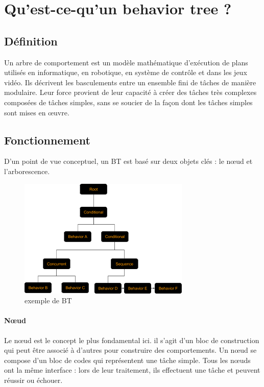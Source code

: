 \documentclass[titlepage]{article}
\begin{document}
	\section{Qu'est-ce-qu'un behavior tree ?}
		\subsection{Définition}
		Un arbre de comportement est un modèle mathématique d'exécution de plans utilisés en informatique, en robotique, en système de contrôle et dans les jeux vidéo. Ils décrivent les basculements entre un ensemble fini de tâches de manière modulaire. Leur force provient de leur capacité à créer des tâches très complexes composées de tâches simples, sans se soucier de la façon dont les tâches simples sont mises en œuvre. \cite{wikipedia_BT}
		\subsection{Fonctionnement}
		
		D'un point de vue conceptuel, un BT est basé sur deux objets clés : le nœud et l'arborescence.
		
		\begin{figure}[h!]
			\includegraphics[width=\linewidth]{img/behavior_trees_example.png}
			\caption{exemple de BT \cite{rasmussen}}
			\label{fig:BT1}
		\end{figure}
		
		\paragraph{Nœud}
		Le nœud est le concept le plus fondamental ici. il s'agit d'un bloc de construction qui peut être associé à d'autres pour construire des comportements. Un nœud se compose d'un bloc de codes qui représentent une tâche simple. Tous les nœuds ont la même interface : lors de leur traitement, ils effectuent une tâche et peuvent réussir ou échouer.
		
\end{document}
